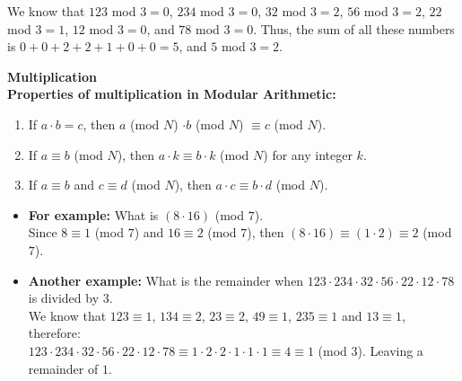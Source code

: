 \begin{justify}
\begin{itemize}
We know that $123$ mod $3 = 0$, $234$ mod $3 = 0$, $32$ mod $3 = 2$, $56$ mod $3 = 2$, $22$ mod $3 = 1$, $12$ mod $3 = 0$, and $78$ mod $3 = 0$. 
Thus, the sum of all these numbers is $0 + 0 + 2 + 2 + 1 + 0 + 0 = 5$, and $5$ mod $3 = 2$.
\end{itemize}
\textbf{Multiplication}\\
\textbf{Properties of multiplication in Modular Arithmetic:}
\begin{enumerate}
\item If $a \cdot b = c$, then $a$ (mod $N$) $\cdot b$ (mod $N$) $\equiv c$ (mod $N$).
\item If $a \equiv b$ (mod $N$), then $a \cdot k \equiv b \cdot k$ (mod $N$) for any integer $k$.
\item If $a \equiv b$ and $c \equiv d$ (mod $N$), then $a \cdot c \equiv b \cdot d$ (mod $N$).
\end{enumerate}
\begin{itemize}
\item \textbf{For example:} What is $(8 \cdot 16)$ (mod $7$).\\
Since $8 \equiv 1$ (mod $7$) and $16 \equiv 2$ (mod $7$), then $(8 \cdot 16) \equiv (1 \cdot 2) \equiv 2$ (mod $7$).
\item \textbf{Another example:} What is the remainder when $123 \cdot 234 \cdot 32 \cdot 56 \cdot 22 \cdot 12 \cdot 78$ is divided by $3$.\\
We know that $123 \equiv 1$, $134 \equiv 2$, $23 \equiv 2$, $49 \equiv 1$, $235 \equiv 1$ and $13 \equiv 1$, therefore:\\
$123 \cdot 234 \cdot 32 \cdot 56 \cdot 22 \cdot 12 \cdot 78 \equiv 1 \cdot 2 \cdot 2 \cdot 1 \cdot 1 \cdot 1 \equiv 4 \equiv 1$ (mod $3$).
Leaving a remainder of $1$.
\end{itemize}
\end{justify}
